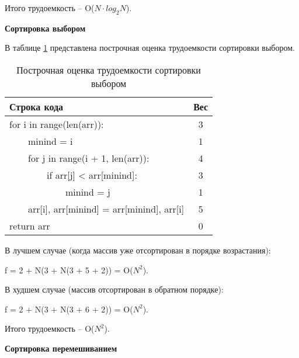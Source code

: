    Итого трудоемкость -- O($N \cdot log_2 N$).
    
    \textbf{Сортировка выбором}
    
    В таблице \ref{tbl:selection_weight} представлена построчная оценка трудоемкости сортировки выбором.
    \begin{table}[h]
    \begin{center}
        \begin{threeparttable}
        \captionsetup{}
        \caption{\label{tbl:selection_weight}Построчная оценка трудоемкости сортировки выбором}
        \begin{tabular}{|l|c|}
            \hline
            Строка кода & Вес \\
            \hline
            for i in range(len(arr)): & 3 \\ 
            \hline
            ~~~~minind = i & 1 \\ 
            \hline
            ~~~~for j in range(i + 1, len(arr)): & 4 \\ 
            \hline
            ~~~~~~~~if arr[j] < arr[minind]: & 3 \\ 
            \hline
            ~~~~~~~~~~~~minind = j & 1 \\ 
            \hline
            ~~~~arr[i], arr[minind] = arr[minind], arr[i] & 5 \\ 
            \hline
            return arr & 0 \\ 
            \hline
		\end{tabular}
        \end{threeparttable}
    \end{center}
    \end{table}

    \FloatBarrier
    
    В лучшем случае (когда массив уже отсортирован в порядке возрастания):

    f = 2 + N(3 + N(3 + 5 + 2)) = O($N^2$).
    
    В худшем случае (массив отсортирован в обратном порядке):
    
    f = 2 + N(3 + N(3 + 6 + 2)) = O($N^2$).
     
    Итого трудоемкость -- O($N^2$).

    \textbf{Сортировка перемешиванием}
    
